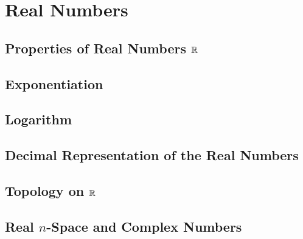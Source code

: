 \chapter{Real Numbers}

\section{\texorpdfstring{Properties of Real Numbers $\mathbb{R}$}{Properties of Real Numbers R}}

\section{Exponentiation}

\section{Logarithm}

\section{Decimal Representation of the Real Numbers}

\section{\texorpdfstring{Topology on $\mathbb{R}$}{Topology on R}}

\section{\texorpdfstring{Real $n$-Space and Complex Numbers}{Real n-space and Complex Numbers}}